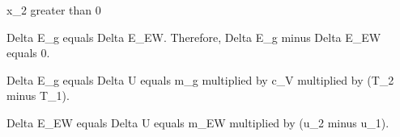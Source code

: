 x_2 greater than 0  

Delta E_g equals Delta E_EW. Therefore, Delta E_g minus Delta E_EW equals 0.  

Delta E_g equals Delta U equals m_g multiplied by c_V multiplied by (T_2 minus T_1).  

Delta E_EW equals Delta U equals m_EW multiplied by (u_2 minus u_1).
